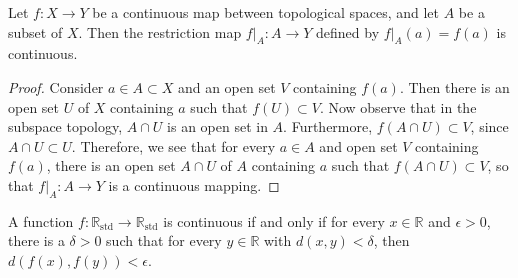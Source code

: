\documentclass[letter,12pt,twoside]{hmcpset}
\begin{document}
\begin{problem}[Theorem 8.4]
    Let $f: X \rightarrow Y$ be a continuous map between topological spaces,
    and let $A$ be a subset of $X$. Then the restriction map 
    $f|_A : A \rightarrow Y$ defined by $f|_A(a) = f(a)$ is continuous.    
\end{problem}

\begin{proof}
    Consider $a \in A \subset X$ and an open set $V$ containing $f(a)$. Then 
    there is an open set $U$ of $X$ containing $a$ such that $f(U) \subset V$.
    Now observe that in the subspace topology, $A \cap U$ is an open set in 
    $A$. Furthermore, $f(A \cap U) \subset V$, since $A \cap U \subset U$.
    Therefore, we see that for every $a \in A$ and open set $V$ containing
    $f(a)$, there is an open set $A \cap U$ of $A$ containing $a$ such that $f(A
    \cap U) \subset V$, so that $f|_A: A \rightarrow Y$ is a continuous mapping.
\end{proof}

\begin{problem}[Theorem 8.5]
    A function $f: \mathbb{R}_{\text{std}} \rightarrow \mathbb{R}_{\text{std}}$
    is continuous if and only if for every $x \in \mathbb{R}$ and $\epsilon >
    0$, there is a $\delta > 0$ such that for every $y \in \mathbb{R}$ with 
    $d(x, y) < \delta$, then $d(f(x), f(y)) < \epsilon$.
\end{problem}
\end{document}
